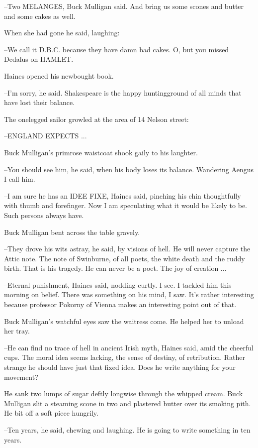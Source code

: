 --Two MELANGES,
Buck Mulligan said.
And bring us some scones and butter
and some cakes as well.

When she had gone
he said, laughing:

--We call it D.B.C. because they have damn bad cakes.
O, but you missed
Dedalus on HAMLET.

Haines opened his newbought book.%

--I'm sorry,
he said.
Shakespeare is the happy huntingground of all minds
that have lost their balance.

The onelegged sailor growled at the area of 14 Nelson street:

--ENGLAND EXPECTS ...

Buck Mulligan's primrose waistcoat shook gaily to his laughter.

--You should see him,
he said,
when his body loses its balance.
Wandering
Aengus I call him.

--I am sure he has an IDEE FIXE,
Haines said,
pinching his chin thoughtfully with thumb and forefinger.
Now I am speculating what it would be likely to be.
Such persons always have.

Buck Mulligan bent across the table gravely.

--They drove his wits astray,
he said,
by visions of hell.
He will never
capture the Attic note.
The note of Swinburne,
of all poets,
the white
death and the ruddy birth.
That is his tragedy.
He can never be a poet.
The joy of creation ...

--Eternal punishment,
Haines said,
nodding curtly.
I see.
I tackled him
this morning on belief.
There was something on his mind, I saw.
It's
rather interesting
because professor Pokorny of Vienna makes an
interesting point out of that.

Buck Mulligan's watchful eyes saw the waitress come.
He helped her to unload her tray.

--He can find no trace of hell in ancient Irish myth,
Haines said,
amid
the cheerful cups.
The moral idea seems lacking,
the sense of destiny, of
retribution.
Rather strange he should have just that fixed idea.
Does he
write anything for your movement?

He sank two lumps of sugar deftly longwise
through the whipped
cream.
Buck Mulligan slit a steaming scone in two
and plastered butter
over its smoking pith.
He bit off a soft piece hungrily.

--Ten years,
he said,
chewing and laughing.
He is going to write something in ten years.%

